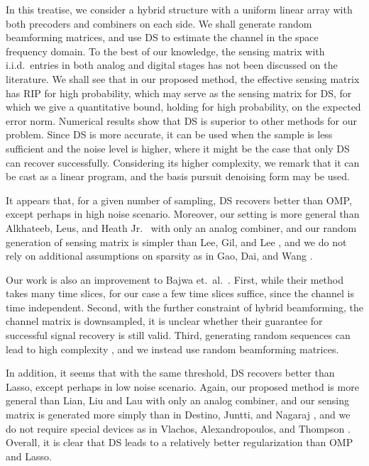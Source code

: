\documentclass[journal]{IEEEtran}
\newcounter {result}
\begin{document}
In this treatise, we consider a hybrid structure with a uniform linear array with both precoders and combiners on each side.
We shall generate random beamforming matrices, and use DS to estimate the channel in the space frequency domain.
To the best of our knowledge, the sensing matrix with i.i.d.\ entries in both analog and digital stages has not been discussed on the literature.
We shall see that in our proposed method, the effective sensing matrix has RIP for high probability, which may serve as the sensing matrix for DS,
for which we give a quantitative bound, holding for high probability, on the expected error norm.
Numerical results show that DS is superior to other methods for our problem.
Since DS is more accurate, it can be used when the sample is less sufficient and the noise level is higher, where it might be the case that only DS can recover successfully.
Considering its higher complexity, we remark that it can be cast as a linear program, and the basis pursuit denoising form may be used.

It appears that, for a given number of sampling, DS recovers better than OMP, except perhaps in high noise scenario.
Moreover, our setting is more general than Alkhateeb, Leus, and Heath Jr.\ \cite {ALH15} with only an analog combiner,
and our random generation of sensing matrix is simpler than Lee, Gil, and Lee \cite {LGL16},
and we do not rely on additional assumptions on sparsity as in Gao, Dai, and Wang \cite {GDW15}.

Our work is also an improvement to Bajwa et.\ al.\ \cite {BHS10}.
First, while their method takes many time slices, for our case a few time slices suffice, since the channel is time independent.
Second, with the further constraint of hybrid beamforming, the channel matrix is downsampled, it is unclear whether their guarantee for successful signal recovery is still valid.
Third, generating random sequences can lead to high complexity \cite {LGL16}, and we instead use random beamforming matrices.

In addition, it seems that with the same threshold, DS recovers better than Lasso, except perhaps in low noise scenario.
Again, our proposed method is more general than Lian, Liu and Lau \cite {LLL17} with only an analog combiner,
and our sensing matrix is generated more simply than in Destino, Juntti, and Nagaraj \cite {DJN15},
and we do not require special devices as in Vlachos, Alexandropoulos, and Thompson \cite {VAT19}.
Overall, it is clear that DS leads to a relatively better regularization than OMP and Lasso.
\end{document}
